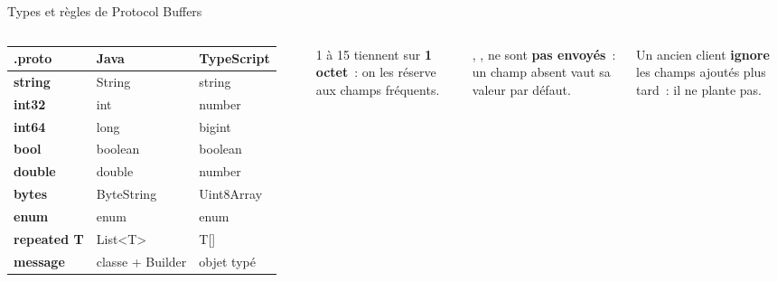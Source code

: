 \documentclass[aspectratio=169,11pt]{beamer}
\begin{document}
\begin{frame}{Types et règles de Protocol Buffers}
  \begin{columns}[T,onlytextwidth]
    \footnotesize
    \renewcommand{\arraystretch}{1.25}
    \begin{tabular}{@{}>{\ttfamily\bfseries}l>{\ttfamily}l>{\ttfamily}l@{}}
      \toprule
      \normalfont\bfseries .proto & \normalfont\bfseries Java & \normalfont\bfseries TypeScript \\
      \midrule
      string     & String          & string \\
      int32      & int             & number \\
      int64      & long            & bigint \\
      bool       & boolean         & boolean \\
      double     & double          & number \\
      bytes      & ByteString      & Uint8Array \\
      enum       & enum            & enum \\
      repeated T & List<T>         & T[] \\
      message    & classe + Builder & objet typé \\
      \bottomrule
    \end{tabular}
    \begin{carte}\footnotesize 1 à 15 tiennent sur \textbf{1 octet}~: on les réserve aux champs fréquents.\end{carte}
    \begin{carte}\footnotesize {}, ,  ne sont \textbf{pas envoyés}~: un champ absent vaut sa valeur par défaut.\end{carte}
    \begin{carte}\footnotesize Un ancien client \textbf{ignore} les champs ajoutés plus tard~: il ne plante pas.\end{carte}
  \end{columns}
\end{frame}
\end{document}
